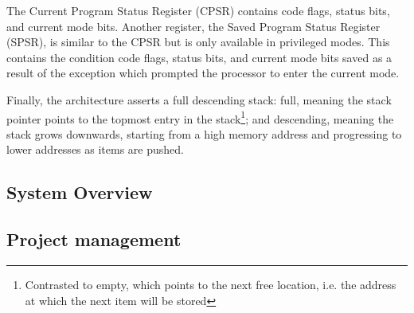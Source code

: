        The Current Program Status Register (CPSR) contains code flags, status
       bits, and current mode bits.  Another register, the Saved Program Status
       Register (SPSR), is similar to the CPSR but is only available in
       privileged modes. This contains the condition code flags, status bits,
       and current mode bits saved as a result of the exception which prompted
       the processor to enter the current mode.

       Finally, the architecture asserts a full descending stack: full, meaning
       the stack pointer points to the topmost entry in the
       stack\footnote{Contrasted to empty, which points to the next free
       location, i.e. the address at which the next item will be stored};
       and descending, meaning the stack grows downwards, starting from a high
       memory address and progressing to lower addresses as items are pushed.

\subsection{System Overview}

\subsection{Project management}
